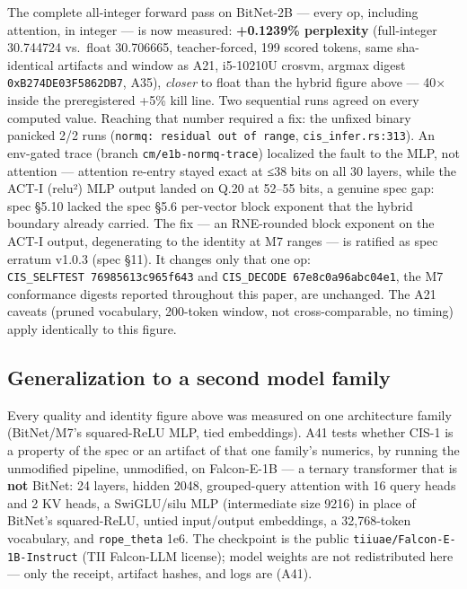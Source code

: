 \documentclass[11pt]{article}
\begin{document}
The complete all-integer forward pass on BitNet-2B --- every op, including
attention, in integer --- is now measured: \textbf{+0.1239\% perplexity} (full-integer
30.744724 vs.~float 30.706665, teacher-forced, 199 scored tokens, same
sha-identical artifacts and window as A21, i5-10210U crosvm, argmax digest
\texttt{0xB274DE03F5862DB7}, A35), \emph{closer} to float than the hybrid figure above ---
40× inside the preregistered +5\% kill line. Two sequential runs agreed on
every computed value. Reaching that number required a fix: the unfixed
binary panicked 2/2 runs (\texttt{normq:\ residual\ out\ of\ range}, \texttt{cis\_infer.rs:313}).
An env-gated trace (branch \texttt{cm/e1b-normq-trace}) localized the fault to the
MLP, not attention --- attention re-entry stayed exact at ≤38 bits on all 30
layers, while the ACT-I (relu²) MLP output landed on Q.20 at 52--55 bits, a
genuine spec gap: spec §5.10 lacked the spec §5.6 per-vector block exponent that the
hybrid boundary already carried. The fix --- an RNE-rounded block exponent on
the ACT-I output, degenerating to the identity at M7 ranges --- is ratified as
spec erratum v1.0.3 (spec §11). It changes only that one op: \texttt{CIS\_SELFTEST\ 76985613c965f643} and \texttt{CIS\_DECODE\ 67e8c0a96abc04e1}, the M7 conformance
digests reported throughout this paper, are unchanged. The A21 caveats
(pruned vocabulary, 200-token window, not cross-comparable, no timing) apply
identically to this figure.

\subsection{Generalization to a second model family}\label{generalization-to-a-second-model-family}

Every quality and identity figure above was measured on one architecture family (BitNet/M7's
squared-ReLU MLP, tied embeddings). A41 tests whether CIS-1 is a property of the spec or an
artifact of that one family's numerics, by running the unmodified pipeline, unmodified, on
Falcon-E-1B --- a ternary transformer that is \textbf{not} BitNet: 24 layers, hidden 2048, grouped-query
attention with 16 query heads and 2 KV heads, a SwiGLU/silu MLP (intermediate size 9216) in place
of BitNet's squared-ReLU, untied input/output embeddings, a 32,768-token vocabulary, and
\texttt{rope\_theta} 1e6. The checkpoint is the public \texttt{tiiuae/Falcon-E-1B-Instruct} (TII Falcon-LLM
license); model weights are not redistributed here --- only the receipt, artifact hashes, and logs
are (A41).
\end{document}
